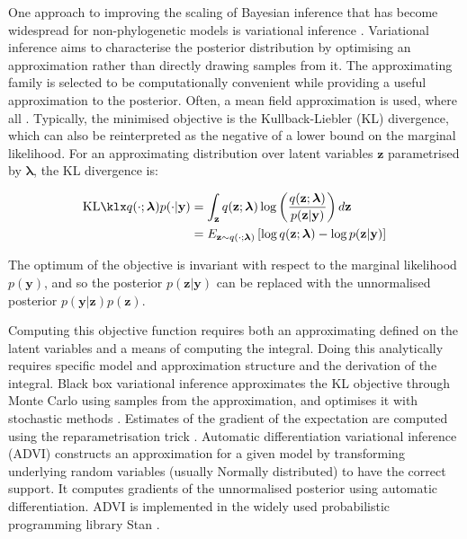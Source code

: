 One approach to improving the scaling of Bayesian inference that has become widespread for non-phylogenetic models is variational inference \cite{jordan1999introduction}. Variational inference aims to characterise the posterior distribution by optimising an approximation rather than directly drawing samples from it. The approximating family is selected to be computationally convenient while providing a useful approximation to the posterior. Often, a mean field approximation is used, where all . Typically, the minimised objective is the Kullback-Liebler (KL) divergence, which can also be reinterpreted as the negative of a lower bound on the marginal likelihood. For an approximating distribution over latent variables $\mathbf{z}$ parametrised by $\bm{\lambda}$, the KL divergence is:

\begin{align*}
\kl{q(\cdot;\bm{\lambda})}{p(\cdot|\mathbf{y})} &= \int_\mathbf{z}q(\mathbf{z};\bm{\lambda})\log\left(\frac{q(\mathbf{z};\bm{\lambda})}{p(\mathbf{z}|\mathbf{y})}\right)d\mathbf{z} \\
    &= E_{\mathbf{z}\sim q(\cdot;\bm{\lambda})}\left[ \log q(\mathbf{z};\bm{\lambda}) - \log p(\mathbf{z}|\mathbf{y})\right]
\end{align*}

The optimum of the objective is invariant with respect to the marginal likelihood $p(\mathbf{y})$, and so the posterior $p(\mathbf{z}|\mathbf{y})$ can be replaced with the unnormalised posterior $p(\mathbf{y}|\mathbf{z})p(\mathbf{z})$.

Computing this objective function requires both an approximating defined on the latent variables and a means of computing the integral. Doing this analytically requires specific model and approximation structure and the derivation of the integral. Black box variational inference \cite{ranganath2014black}approximates the KL objective through Monte Carlo using samples from the approximation, and optimises it with stochastic methods \cite{robbins1951stochastic}. Estimates of the gradient of the expectation are computed using the reparametrisation trick \cite{kingma2013auto}. Automatic differentiation variational inference (ADVI) \cite{kucukelbir2017automatic} constructs an approximation for a given model by transforming underlying random variables (usually Normally distributed) to have the correct support. It computes gradients of the unnormalised posterior using automatic differentiation. ADVI is implemented in the widely used probabilistic programming library Stan \cite{carpenter2017stan}.

